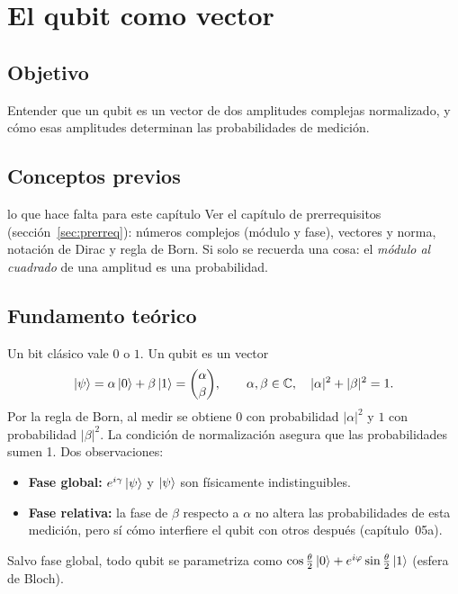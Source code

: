 \def\tituloconcepto{El qubit como vector}


\section{El qubit como vector}

\subsection{Objetivo}
Entender que un qubit es un vector de dos amplitudes complejas normalizado, y
cómo esas amplitudes determinan las probabilidades de medición.

\subsection{Conceptos previos}
\begin{concepto}{lo que hace falta para este capítulo}
Ver el capítulo de prerrequisitos (sección~\ref{sec:prerreq}): números
complejos (módulo y fase), vectores y norma, notación de Dirac y regla de Born.
Si solo se recuerda una cosa: el \emph{módulo al cuadrado} de una amplitud es
una probabilidad.
\end{concepto}

\subsection{Fundamento teórico}
Un bit clásico vale $0$ o $1$. Un qubit es un vector
\begin{equation}
  \left|\psi\right\rangle=\alpha\left|0\right\rangle+\beta\left|1\right\rangle=\binom{\alpha}{\beta},\qquad
  \alpha,\beta\in\mathbb{C},\quad |\alpha|^2+|\beta|^2=1 .
\end{equation}
Por la regla de Born, al medir se obtiene $0$ con probabilidad $|\alpha|^2$ y
$1$ con probabilidad $|\beta|^2$. La condición de normalización asegura que
las probabilidades sumen 1. Dos observaciones:
\begin{itemize}
  \item \textbf{Fase global:} $e^{i\gamma}\left|\psi\right\rangle$ y $\left|\psi\right\rangle$ son físicamente
    indistinguibles.
  \item \textbf{Fase relativa:} la fase de $\beta$ respecto a $\alpha$ no altera
    las probabilidades de esta medición, pero sí cómo interfiere el qubit con
    otros después (capítulo~05a).
\end{itemize}
Salvo fase global, todo qubit se parametriza como
$\cos\frac\theta2\left|0\right\rangle+e^{i\varphi}\sin\frac\theta2\left|1\right\rangle$ (esfera de Bloch).

